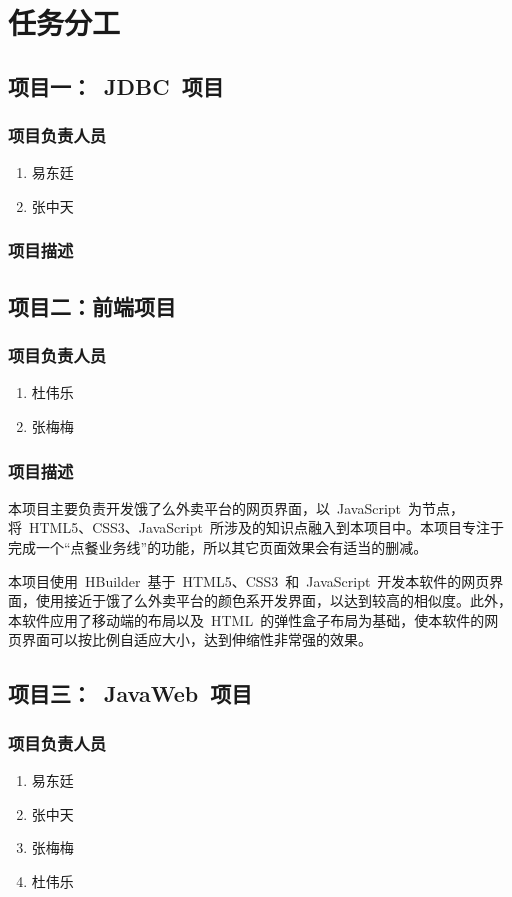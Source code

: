 \chapter{任务分工}
\section{项目一：~JDBC~项目}
\subsection{项目负责人员}
\begin{enumerate}
    \item{易东廷}
    \item{张中天}
\end{enumerate}
\subsection{项目描述}

\section{项目二：前端项目}
\subsection{项目负责人员}
\begin{enumerate}
    \item{杜伟乐}
    \item{张梅梅}
\end{enumerate}
\subsection{项目描述}
本项目主要负责开发饿了么外卖平台的网页界面，以~JavaScript~为节点，将~HTML5、CSS3、JavaScript~所涉及的知识点融入到本项目中。本项目专注于完成一个“点餐业务线”的功能，所以其它页面效果会有适当的删减。

本项目使用~HBuilder~基于~HTML5、CSS3~和~JavaScript~开发本软件的网页界面，使用接近于饿了么外卖平台的颜色系开发界面，以达到较高的相似度。此外，本软件应用了移动端的布局以及~HTML~的弹性盒子布局为基础，使本软件的网页界面可以按比例自适应大小，达到伸缩性非常强的效果。

\section{项目三：~JavaWeb~项目}
\subsection{项目负责人员}
\begin{enumerate}
    \item{易东廷}
    \item{张中天}
    \item{张梅梅}
    \item{杜伟乐}
\end{enumerate}

